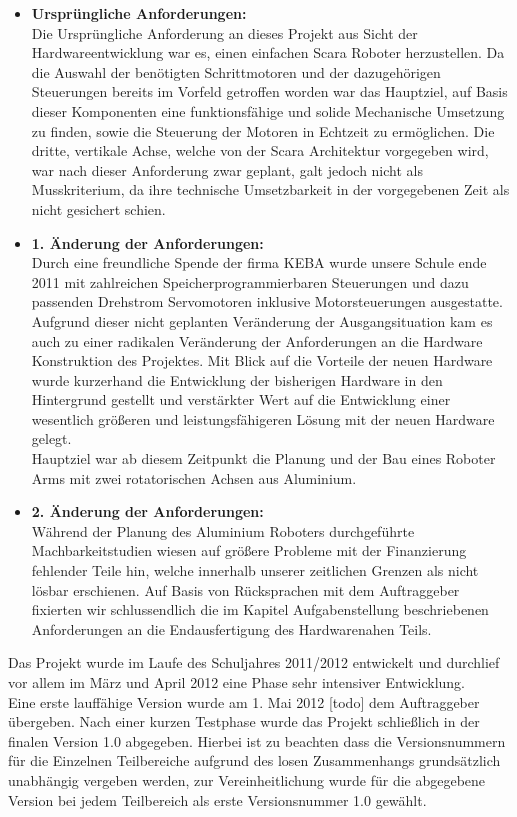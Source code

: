 \begin{itemize}
\item \textbf{Ursprüngliche Anforderungen:}\\
Die Ursprüngliche Anforderung an dieses Projekt aus Sicht der Hardwareentwicklung war es, einen einfachen Scara Roboter herzustellen. Da die Auswahl der benötigten Schrittmotoren und der dazugehörigen Steuerungen bereits im Vorfeld getroffen worden war das Hauptziel, auf Basis dieser Komponenten eine funktionsfähige und solide Mechanische Umsetzung zu finden, sowie die Steuerung der Motoren in Echtzeit zu ermöglichen.
Die dritte, vertikale Achse, welche von der Scara Architektur vorgegeben wird, war nach dieser Anforderung zwar geplant, galt jedoch nicht als Musskriterium, da ihre technische Umsetzbarkeit in der vorgegebenen Zeit als nicht gesichert schien.
\newpage
\item \textbf{1. Änderung der Anforderungen:}\\
Durch eine freundliche Spende der firma KEBA wurde unsere Schule ende 2011 mit zahlreichen Speicherprogrammierbaren Steuerungen und dazu passenden Drehstrom Servomotoren inklusive Motorsteuerungen ausgestatte. Aufgrund dieser nicht geplanten Veränderung der Ausgangsituation kam es auch zu einer radikalen Veränderung der Anforderungen an die Hardware Konstruktion des Projektes. 
Mit Blick auf die Vorteile der neuen Hardware wurde kurzerhand die Entwicklung der bisherigen Hardware in den Hintergrund gestellt und verstärkter Wert auf die Entwicklung einer wesentlich größeren und leistungsfähigeren Lösung mit der neuen Hardware gelegt.\\
Hauptziel war ab diesem Zeitpunkt die Planung und der Bau eines Roboter Arms mit zwei rotatorischen Achsen aus Aluminium.

\item \textbf{2. Änderung der Anforderungen:}\\
Während der Planung des Aluminium Roboters durchgeführte Machbarkeitstudien wiesen auf größere Probleme mit der Finanzierung fehlender Teile hin, welche innerhalb unserer zeitlichen Grenzen als nicht lösbar erschienen. Auf Basis von Rücksprachen mit dem Auftraggeber fixierten wir schlussendlich die im Kapitel Aufgabenstellung beschriebenen Anforderungen an die Endausfertigung des Hardwarenahen Teils.
\end{itemize}
Das Projekt wurde im Laufe des Schuljahres 2011/2012 entwickelt und durchlief vor allem im März und April 2012 eine Phase sehr intensiver Entwicklung.\\
Eine erste lauffähige Version wurde am 1. Mai 2012 [todo] dem Auftraggeber übergeben. Nach einer kurzen Testphase wurde das Projekt schließlich in der finalen Version 1.0 abgegeben. Hierbei ist zu beachten dass die Versionsnummern für die Einzelnen Teilbereiche aufgrund des losen Zusammenhangs grundsätzlich unabhängig vergeben werden, zur Vereinheitlichung wurde für die abgegebene Version bei jedem Teilbereich als erste Versionsnummer 1.0 gewählt. 
